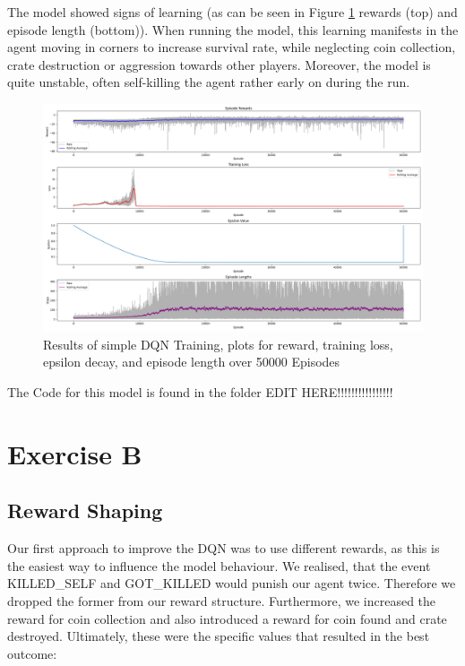 \documentclass{article} %
\begin{document}
	 The model showed signs of learning (as can be seen in Figure \ref{fig:1} rewards (top) and episode length (bottom)). When running the model, this learning manifests in the agent moving in corners to increase survival rate, while neglecting coin collection, crate destruction or aggression towards other players. Moreover, the model is quite unstable, often self-killing the agent rather early on during the run. 
	
	\begin{figure}[h!]
		\centering
		\includegraphics[width=1.0\textwidth]{images/first_training_results}
		\caption{Results of simple DQN Training, plots for reward, training loss, epsilon decay, and episode length over 50000 Episodes}
		\label{fig:1}
	\end{figure}
	
	
	The Code for this model is found in the folder EDIT HERE!!!!!!!!!!!!!!!!
	\newpage
	
	\section{Exercise B}
	\subsection{Reward Shaping}
	Our first approach to improve the DQN was to use different rewards, as this is the easiest way to influence the model behaviour. We realised, that the event KILLED\_SELF and GOT\_KILLED would punish our agent twice. Therefore we dropped the former from our reward structure. Furthermore, we increased the reward for coin collection and also introduced a reward for coin found and crate destroyed. Ultimately, these were the specific values that resulted in the best outcome:\newline
	
\end{document}
